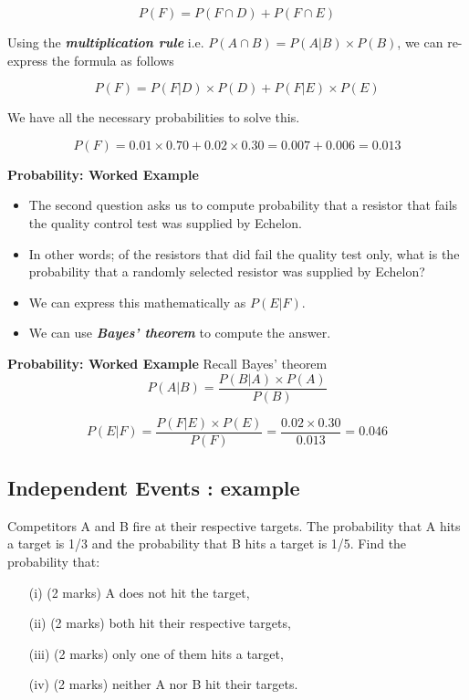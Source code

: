 \documentclass[]{report}
\begin{document}
\[ P(F)  = P(F \cap D) + P(F \cap E) \]



Using the \textbf{\emph{multiplication rule}}  i.e. $P(A \cap B) = P(A|B) \times P(B)$, we can re-express the formula as follows

\[ P(F)  = P(F|D) \times P(D) + P(F|E) \times P(E) \]

We have all the necessary probabilities to solve this.

\[ P(F)  = 0.01 \times 0.70 + 0.02 \times 0.30   = 0.007 + 0.006  = 0.013\]





{
	\noindent \textbf{Probability: Worked Example}
	
	\begin{itemize}
		\item
		The second question asks us to compute probability that a resistor that fails the quality control test was supplied by Echelon.
		\item In other words; of the resistors that did fail the quality test only, what is the probability that a randomly selected resistor was supplied by Echelon?
		\item We can express this mathematically as $P(E|F)$.
		\item We can use \textbf{\emph{Bayes' theorem}} to compute the answer.
	\end{itemize}
	
	
	
	\noindent \textbf{Probability: Worked Example}
	Recall Bayes' theorem
	\[ P(A|B) = \frac{P(B|A)\times P(A)}{P(B)} \]
	\bigskip
	
	\[ P(E|F) = \frac{P(F|E)\times P(E)}{P(F)}  =  \frac{0.02 \times 0.30}{0.013} = 0.046\]
	
}

\subsection{Independent Events : example}
Competitors A and B fire at their respective targets. The probability that A hits a target is 1/3 and the probability that B hits a target is 1/5. Find the probability that:
\begin{itemize}
	\item[(i)] (2 marks) A does not hit the target,
	\item[(ii)](2 marks)  both hit their respective targets,
	\item[(iii)](2 marks)  only one of them hits a target,
	\item[(iv)](2 marks) neither A nor B hit their targets.
\end{itemize}
\end{document}

